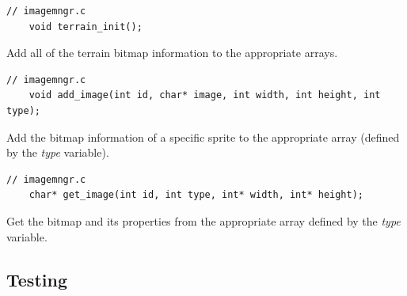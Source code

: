 \documentclass{article}
\begin{document}
\begin{lstlisting}[style=CStyle]
	// imagemngr.c
	void terrain_init();
\end{lstlisting}
Add all of the terrain bitmap information to the appropriate arrays.
\begin{lstlisting}[style=CStyle]
	// imagemngr.c
	void add_image(int id, char* image, int width, int height, int type);
\end{lstlisting}
Add the bitmap information of a specific sprite to the appropriate array (defined by the \emph{type} variable).
\begin{lstlisting}[style=CStyle]
	// imagemngr.c
	char* get_image(int id, int type, int* width, int* height);
\end{lstlisting}
Get the bitmap and its properties from the appropriate array defined by the \emph{type} variable.

\newpage

\subsection*{Testing}
\end{document}
